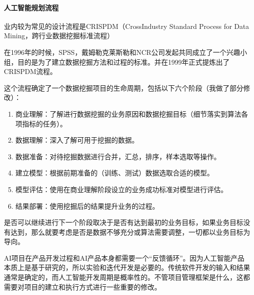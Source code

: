 \documentclass[letterpaper,11pt,english]{sphinxmanual}
\begin{document}
\paragraph{人工智能规划流程}
\label{\detokenize{chapter_project/process:id13}}
业内较为常见的设计流程是CRISP\sphinxhyphen{}DM（Cross\sphinxhyphen{}Industry Standard Process for
Data Mining，跨行业数据挖掘标准流程）

\begin{center}\end{center} 

在1996年的时候，SPSS，戴姆勒\sphinxhyphen{}克莱斯勒和NCR公司发起共同成立了一个兴趣小组，目的是为了建立数据挖掘方法和过程的标准。并在1999年正式提炼出了CRISP\sphinxhyphen{}DM流程。

这个流程确定了一个数据挖掘项目的生命周期，包括以下六个阶段（我做了部分修改）：
\begin{enumerate}
%
\item {} 
商业理解：了解进行数据挖掘的业务原因和数据挖掘目标（细节落实到算法各项指标的任务）。

\item {} 
数据理解：深入了解可用于挖掘的数据。

\item {} 
数据准备：对待挖掘数据进行合并，汇总，排序，样本选取等操作。

\item {} 
建立模型：根据前期准备的（训练、测试）数据选取合适的模型。

\item {} 
模型评估：使用在商业理解阶段设立的业务成功标准对模型进行评估。

\item {} 
结果部署：使用挖掘后的结果提升业务的过程。

\end{enumerate}

是否可以继续进行下一个阶段取决于是否有达到最初的业务目标，如果业务目标没有达到，那么就要考虑是否是数据不够充分或算法需要调整，一切都以业务目标为导向。

AI项目在产品开发过程和AI产品本身都需要一个“反馈循环”。因为人工智能产品本质上是基于研究的，所以实验和迭代开发是必要的。传统软件开发的输入和结果通常是确定的，而人工智能开发周期是概率性的。不管项目管理框架是什么，这都需要对项目的建立和执行方式进行一些重要的修改。%
\begin{footnote}[725]\sphinxAtStartFootnote
{}
%
\end{footnote}
\end{document}
